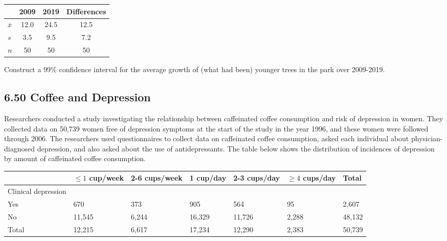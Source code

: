 \documentclass{article}
\begin{document}
\begin{table}[h!]
    \centering
    \begin{tabular}{lccc}
         & 2009 & 2019 & Differences \\
        \hline
        $\overline{x}$ & 12.0 & 24.5 & 12.5 \\
        $s$ & 3.5 & 9.5 & 7.2 \\
        $n$ & 50 & 50 & 50 \\
    \end{tabular}
\end{table}


Construct a 99\% confidence interval for the average growth of (what had been) younger trees in the park over 2009-2019.

\subsection*{6.50 Coffee and Depression}
Researchers conducted a study investigating the relationship between caffeinated coffee consumption and risk of depression in women. They collected data on 50,739 women free of depression symptoms at the start of the study in the year 1996, and these women were followed through 2006. The researchers used questionnaires to collect data on caffeinated coffee consumption, asked each individual about physician-diagnosed depression, and also asked about the use of antidepressants. The table below shows the distribution of incidences of depression by amount of caffeinated coffee consumption.


\begin{table}[ht!]
    \centering
    \footnotesize
    \begin{tabularx}{\textwidth}{lXXXXXX}
         & $\leq 1$ cup/week & 2-6 cups/week & 1 cup/day & 2-3 cups/day & $\geq 4$ cups/day & Total \\
        \hline
        Clinical depression & & & & & & \\
        Yes & 670 & 373 & 905 & 564 & 95 & 2,607 \\
        No & 11,545 & 6,244 & 16,329 & 11,726 & 2,288 & 48,132 \\
        Total & 12,215 & 6,617 & 17,234 & 12,290 & 2,383 & 50,739 \\
    \end{tabularx}
\end{table}
\end{document}
